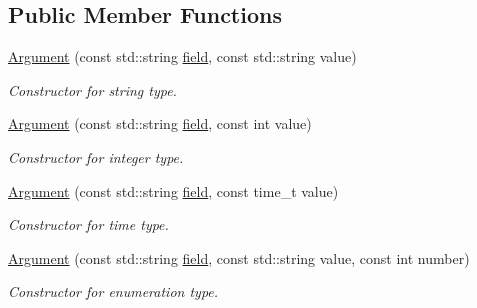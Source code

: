 \subsection*{Public Member Functions}
\begin{DoxyCompactItemize}
\item 
\hyperlink{structStorage_1_1AbstractStorage_1_1Argument_a7c5544b8651222b7170e486e1cdd19ec}{Argument} (const std::string \hyperlink{structStorage_1_1AbstractStorage_1_1Argument_ad48a91372dd1a9445b4ddcee0bc8336a}{field}, const std::string value)
\begin{DoxyCompactList}\small\item\em Constructor for string type. \item\end{DoxyCompactList}\item 
\hyperlink{structStorage_1_1AbstractStorage_1_1Argument_a36dd1d2e038f327be2845c196fed4928}{Argument} (const std::string \hyperlink{structStorage_1_1AbstractStorage_1_1Argument_ad48a91372dd1a9445b4ddcee0bc8336a}{field}, const int value)
\begin{DoxyCompactList}\small\item\em Constructor for integer type. \item\end{DoxyCompactList}\item 
\hyperlink{structStorage_1_1AbstractStorage_1_1Argument_aeb57bbf6db33ce77ae686e53416a670e}{Argument} (const std::string \hyperlink{structStorage_1_1AbstractStorage_1_1Argument_ad48a91372dd1a9445b4ddcee0bc8336a}{field}, const time\_\-t value)
\begin{DoxyCompactList}\small\item\em Constructor for time type. \item\end{DoxyCompactList}\item 
\hyperlink{structStorage_1_1AbstractStorage_1_1Argument_a185bd271874dc64a7848382f2df995d5}{Argument} (const std::string \hyperlink{structStorage_1_1AbstractStorage_1_1Argument_ad48a91372dd1a9445b4ddcee0bc8336a}{field}, const std::string value, const int number)
\begin{DoxyCompactList}\small\item\em Constructor for enumeration type. \item\end{DoxyCompactList}\end{DoxyCompactItemize}
